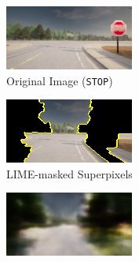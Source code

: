 \begin{figure}[htbp]
\centering
\begin{subfigure}[b]{0.3\textwidth}
    \includegraphics[width=\textwidth]{img/appendix/original_town7_000980.png}
    \caption{Original Image (\texttt{STOP})}
    \label{fig:lime_orig}
\end{subfigure}
\hfill
\begin{subfigure}[b]{0.3\textwidth}
    \includegraphics[width=\textwidth]{img/appendix/LIME_on_Image_maksed_town7_000980.png}
    \caption{LIME-masked Superpixels}
    \label{fig:lime_masked}
\end{subfigure}
\hfill
\begin{subfigure}[b]{0.3\textwidth}
    \includegraphics[width=\textwidth]{img/appendix/LIME_on_Image_reconstructed_town7_000980.png}

\end{subfigure}
\end{figure}
